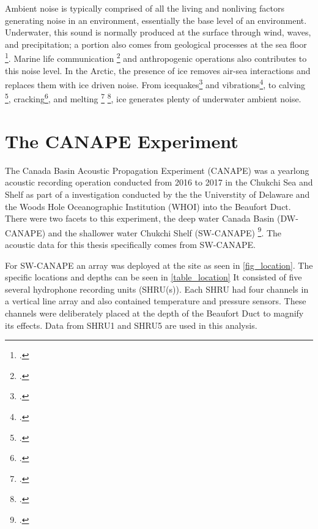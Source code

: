 Ambient noise is typically comprised of all the living and nonliving factors generating noise in an environment, essentially the base level of an environment. Underwater, this sound is normally produced at the surface through wind, waves, and precipitation; a portion also comes from geological processes at the sea floor \footcite[]{dziak2015sources}. Marine life communication \footcite[]{ladegaard2021} and anthropogenic operations also contributes to this noise level. In the Arctic, the presence of ice removes air-sea interactions and replaces them with ice driven noise. From icequakes\footcite[]{muller2005singing} and vibrations\footcite[]{kinda2015arctic}, to calving \footcite[]{matsumoto2014antarctic}, cracking\footcite[]{milne1964ambient}, and melting     \footcite[]{glowacki2018intensity} \footcite[]{mahanty2020melt}, ice generates plenty of underwater ambient noise. 

\section{The CANAPE Experiment} \label{intro_canape}

The Canada Basin Acoustic Propagation Experiment (CANAPE) was a yearlong acoustic recording operation conducted from 2016 to 2017 in the Chukchi Sea and Shelf as part of a investigation conducted by the the Universtity of Delaware and the Woods Hole Oceanographic Institution (WHOI) into the Beaufort Duct. There were two facets to this experiment, the deep water Canada Basin (DW-CANAPE) and the shallower water Chukchi Shelf (SW-CANAPE) \footcite[]{ballard2020yearlong}. The acoustic data for this thesis specifically comes from SW-CANAPE. %

For SW-CANAPE an array was deployed at the site as seen in \autoref{fig_location}. The specific locations and depths can be seen in \autoref{table_location} It consisted of five several hydrophone recording units (SHRU(s)). Each SHRU had four channels in a vertical line array and also contained temperature and pressure sensors. These channels were deliberately placed at the depth of the Beaufort Duct to magnify its effects. Data from SHRU1 and SHRU5 are used in this analysis.

